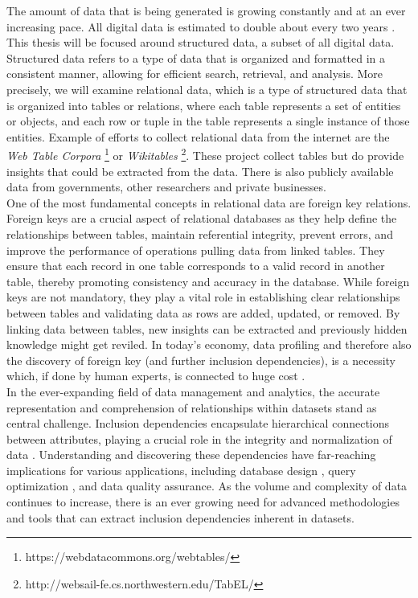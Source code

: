 The amount of data that is being generated is growing constantly and at an ever increasing pace. All digital data is estimated to double about every two years \cite{gantz2012digital}. This thesis will be focused around structured data, a subset of all digital data. Structured data refers to a type of data that is organized and formatted in a consistent manner, allowing for efficient search, retrieval, and analysis. More precisely, we will examine relational data, which is a type of structured data that is organized into tables or relations, where each table represents a set of entities or objects, and each row or tuple in the table represents a single instance of those entities. Example of efforts to collect relational data from the internet are the \textit{Web Table Corpora} \footnote{https://webdatacommons.org/webtables/} or \textit{Wikitables} \footnote{http://websail-fe.cs.northwestern.edu/TabEL/}. These project collect tables but do provide insights that could be extracted from the data. There is also publicly available data from governments, other researchers and private businesses.\\

\noindent One of the most fundamental concepts in relational data are foreign key relations\cite{casanova1982inclusion}. Foreign keys are a crucial aspect of relational databases as they help define the relationships between tables, maintain referential integrity, prevent errors, and improve the performance of operations pulling data from linked tables. They ensure that each record in one table corresponds to a valid record in another table, thereby promoting consistency and accuracy in the database. While foreign keys are not mandatory, they play a vital role in establishing clear relationships between tables and validating data as rows are added, updated, or removed. By linking data between tables, new insights can be extracted and previously hidden knowledge might get reviled. In today's economy, data profiling and therefore also the discovery of foreign key (and further inclusion dependencies), is a necessity which, if done by human experts, is connected to huge cost \cite{halevy2006data}.\\

\noindent In the ever-expanding field of data management and analytics, the accurate representation and comprehension of relationships within datasets stand as central challenge. Inclusion dependencies encapsulate hierarchical connections between attributes, playing a crucial role in the integrity and normalization of data \cite{casanova1982inclusion}. Understanding and discovering these dependencies have far-reaching implications for various applications, including database design \cite{levene2000justification}, query optimization \cite{gryz1998query}, and data quality assurance. As the volume and complexity of data continues to increase, there is an ever growing need for advanced methodologies and tools that can extract inclusion dependencies inherent in datasets. \\

